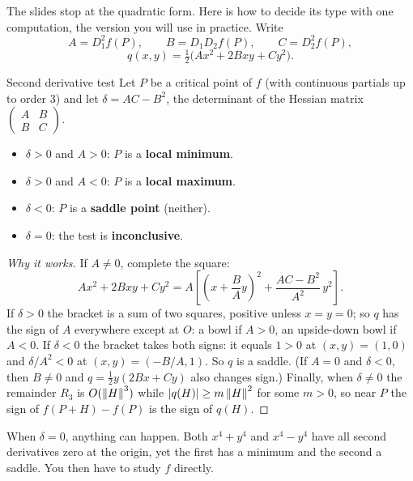 \begin{extra}
The slides stop at the quadratic form. Here is how to decide its type with one computation,
the version you will use in practice. Write
\[ A=D_1^2f(P),\qquad B=D_1D_2f(P),\qquad C=D_2^2f(P), \]
\[ q(x,y)=\tfrac12\big(Ax^2+2Bxy+Cy^2\big). \]
\end{extra}

\begin{theorem}[label=thm:2nd]{Second derivative test}
Let $P$ be a critical point of $f$ (with continuous partials up to order $3$) and let
$\delta=AC-B^2$, the determinant of the Hessian matrix $\begin{pmatrix}A&B\\B&C\end{pmatrix}$.
\begin{itemize}
  \item $\delta>0$ and $A>0$: $P$ is a \textbf{local minimum}.
  \item $\delta>0$ and $A<0$: $P$ is a \textbf{local maximum}.
  \item $\delta<0$: $P$ is a \textbf{saddle point} (neither).
  \item $\delta=0$: the test is \textbf{inconclusive}.
\end{itemize}
\end{theorem}

\begin{proof}[Why it works]
If $A\neq0$, complete the square:
\[
Ax^2+2Bxy+Cy^2=A\left[\left(x+\frac BAy\right)^2+\frac{AC-B^2}{A^2}\,y^2\right].
\]
If $\delta>0$ the bracket is a sum of two squares, positive unless $x=y=0$; so $q$ has the sign of
$A$ everywhere except at $O$: a bowl if $A>0$, an upside-down bowl if $A<0$. If $\delta<0$ the
bracket takes both signs: it equals $1>0$ at $(x,y)=(1,0)$ and $\delta/A^2<0$ at $(x,y)=(-B/A,1)$. So $q$ is a saddle.
(If $A=0$ and $\delta<0$, then $B\neq0$ and $q=\tfrac12y(2Bx+Cy)$ also changes sign.) Finally,
when $\delta\neq0$ the remainder $R_3$ is $O(\left\lVert H\right\rVert^3)$ while $\left\lvert q(H)\right\rvert\ge m\left\lVert H\right\rVert^2$ for some
$m>0$, so near $P$ the sign of $f(P+H)-f(P)$ is the sign of $q(H)$.
\end{proof}

\begin{trap}
When $\delta=0$, anything can happen. Both $x^4+y^4$ and $x^4-y^4$ have all second derivatives
zero at the origin, yet the first has a minimum and the second a saddle. You then have to
study $f$ directly.
\end{trap}

